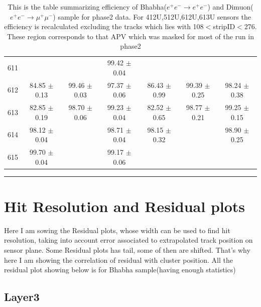\documentclass[12pt]{article}
\begin{document}
\begin{table}
\begin{tabular}{|c|c|c|c||| c|c|c|}
			611	&                  &                      &99.42  $\pm$  0.04  &                    &                      &                      \\
			612	&84.85  $\pm$ 0.13 & 99.46 $\pm$0.03      &97.37  $\pm$  0.06  &  86.43  $\pm$  0.99&  99.39  $\pm$0.25    &98.24    $\pm$ 0.38  \\
			613&82.85  $\pm$ 0.19 & 98.70 $\pm$0.06      &99.23  $\pm$  0.04  &  82.52  $\pm$  0.65&  98.77  $\pm$0.21    &99.25    $\pm$ 0.15  \\
			614&98.12  $\pm$ 0.04 &                      &98.71  $\pm$  0.04  &  98.15  $\pm$  0.32&                      &98.90    $\pm$ 0.25  \\
			615	&99.70  $\pm$ 0.04 &                      &99.17  $\pm$  0.06  &                     &                      &                    \\ \hline
		\end{tabular}
			\caption{This is the table summarizing efficiency of Bhabha($e^+ e^-\rightarrow e^+ e^-$) and Dimuon($e^+ e^-\rightarrow \mu^+ \mu^-$) sample for phase2 data. For 412U,512U,612U,613U sensors the efficiency is recalculated excluding the tracks which lies with 108$<$stripID$<$276. These region corresponds to that APV which was masked for most of the run in phase2  }		
			\label{tab1}	
    \end{table}
    \rule{\textwidth}{0.4pt}
	\pagebreak	
	
	\section{Hit Resolution and Residual plots} Here I am sowing the Residual plots, whose width can be used to find hit resolution, taking into account error associated to extrapolated track position on sensor plane. Some Residual plots has tail, some of then are shifted. That's why here I am showing the correlation of residual with cluster position. All the residual plot showing below is for Bhabha sample(having enough statistics) 
	\subsection{Layer3}
\end{document}
